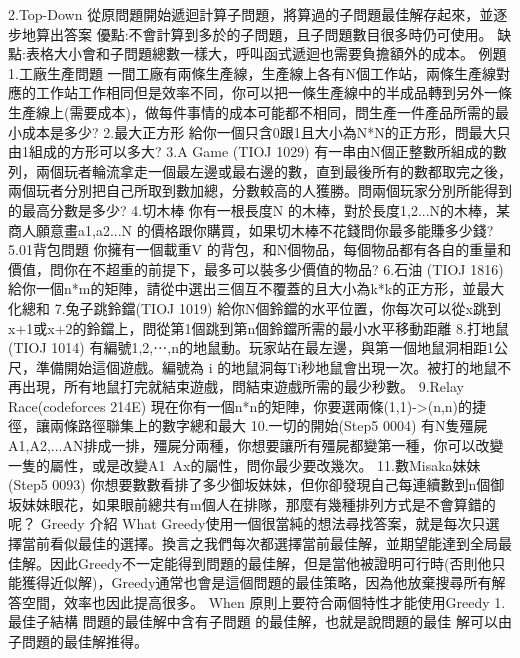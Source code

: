 \documentclass{article}
\begin{document}
                2.Top-Down
                    從原問題開始遞迴計算子問題，將算過的子問題最佳解存起來，並逐步地算出答案 
                    優點:不會計算到多於的子問題，且子問題數目很多時仍可使用。 
                    缺點:表格大小會和子問題總數一樣大，呼叫函式遞迴也需要負擔額外的成本。
    例題
        1.工廠生產問題
            一間工廠有兩條生產線，生產線上各有N個工作站，兩條生產線對應的工作站工作相同但是效率不同，你可以把一條生產線中的半成品轉到另外一條生產線上(需要成本)，做每件事情的成本可能都不相同，問生產一件產品所需的最小成本是多少?
        2.最大正方形
            給你一個只含0跟1且大小為N*N的正方形，問最大只由1組成的方形可以多大?
        3.A Game (TIOJ 1029)
            有一串由N個正整數所組成的數列，兩個玩者輪流拿走一個最左邊或最右邊的數，直到最後所有的數都取完之後，兩個玩者分別把自己所取到數加總，分數較高的人獲勝。問兩個玩家分別所能得到的最高分數是多少?
        4.切木棒
            你有一根長度N 的木棒，對於長度1,2...N的木棒，某商人願意畫a1,a2...N 的價格跟你購買，如果切木棒不花錢問你最多能賺多少錢?
        5.01背包問題
            你擁有一個載重V 的背包，和N個物品，每個物品都有各自的重量和價值，問你在不超重的前提下，最多可以裝多少價值的物品?
        6.石油 (TIOJ 1816)
            給你一個n*m的矩陣，請從中選出三個互不覆蓋的且大小為k*k的正方形，並最大化總和
        7.兔子跳鈴鐺(TIOJ 1019)
            給你N個鈴鐺的水平位置，你每次可以從x跳到x+1或x+2的鈴鐺上，問從第1個跳到第n個鈴鐺所需的最小水平移動距離
        8.打地鼠(TIOJ 1014)
            有編號1,2,⋯,n的地鼠動。玩家站在最左邊，與第一個地鼠洞相距1公尺，準備開始這個遊戲。編號為 i 的地鼠洞每Ti秒地鼠會出現一次。被打的地鼠不再出現，所有地鼠打完就結束遊戲，問結束遊戲所需的最少秒數。
        9.Relay Race(codeforces 214E)
            現在你有一個n*n的矩陣，你要選兩條(1,1)->(n,n)的捷徑，讓兩條路徑聯集上的數字總和最大
        10.一切的開始(Step5 0004)
            有N隻殭屍A1,A2,...AN排成一排，殭屍分兩種，你想要讓所有殭屍都變第一種，你可以改變一隻的屬性，或是改變A1~Ax的屬性，問你最少要改幾次。
        11.數Misaka妹妹(Step5 0093)
            你想要數數看排了多少御坂妹妹，但你卻發現自己每連續數到n個御坂妹妹眼花，如果眼前總共有m個人在排隊，那麼有幾種排列方式是不會算錯的呢？
Greedy
    介紹
        What
            Greedy使用一個很當純的想法尋找答案，就是每次只選擇當前看似最佳的選擇。換言之我們每次都選擇當前最佳解，並期望能達到全局最佳解。因此Greedy不一定能得到問題的最佳解，但是當他被證明可行時(否則他只能獲得近似解)，Greedy通常也會是這個問題的最佳策略，因為他放棄搜尋所有解答空間，效率也因此提高很多。
        When
            原則上要符合兩個特性才能使用Greedy
                1.最佳子結構
                    問題的最佳解中含有子問題 的最佳解，也就是說問題的最佳 解可以由子問題的最佳解推得。
\end{document}
